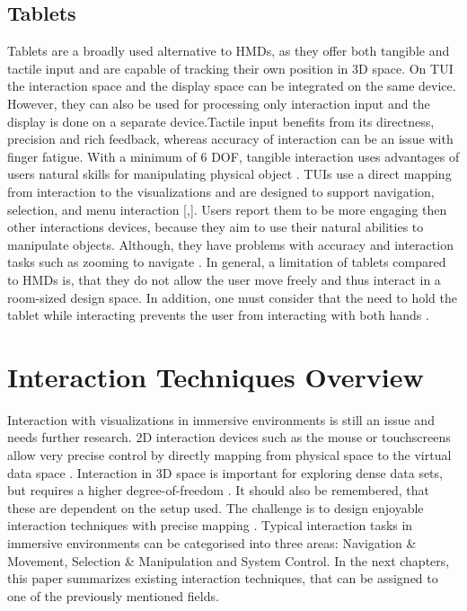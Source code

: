\subsection{Tablets}
Tablets are a broadly used alternative to \ac{HMD}s, as they offer both tangible and tactile input and are capable of tracking their own position in 3D space. On \ac{TUI} the interaction space and the display space can be integrated on the same device. However, they can also be used for processing only interaction input and the display is done on a separate device.\newline Tactile input benefits from its directness, precision and rich feedback, whereas accuracy of interaction can be an issue with finger fatigue. With a minimum of 6 \ac{DOF}, tangible interaction uses advantages of users natural skills for manipulating physical object \autocite[881-882]{Besancon2017}. \newline
\ac{TUI}s use a direct mapping from interaction to the visualizations and are designed to support navigation, selection, and menu interaction [\autocite[47]{Cordeil2017},\autocite[4]{Butscher2018}]. Users report them to be more engaging then other interactions devices, because they aim to use their natural abilities to manipulate objects. Although, they have problems with accuracy and interaction tasks such as zooming to navigate \autocite[882]{Besancon2017}. \newline
In general, a limitation of tablets compared to \ac{HMD}s is, that they do not allow the user move freely and thus interact in a room-sized design space. In addition, one must consider that the need to hold the tablet while interacting prevents the user from interacting with both hands \autocite[883]{Besancon2017}.

\section{Interaction Techniques Overview}
\label{section:Interaction Techniques 3D}
Interaction with visualizations in immersive environments is still an issue and needs further research. 2D interaction devices such as the mouse or touchscreens allow very precise control by directly mapping from physical space to the virtual data space \autocite[1]{Cordeil2017}. Interaction in 3D space is important for exploring dense data sets, but requires a higher degree-of-freedom \autocite[]{Bach2018}. It should also be remembered, that these are dependent on the setup used. The challenge is to design enjoyable interaction techniques with precise mapping \autocite[]{Jankowski2014}. Typical interaction tasks in immersive environments can be categorised into three areas: Navigation \& Movement, Selection \& Manipulation and System Control. In the next chapters, this paper summarizes existing interaction techniques, that can be assigned to one of the previously mentioned fields.

